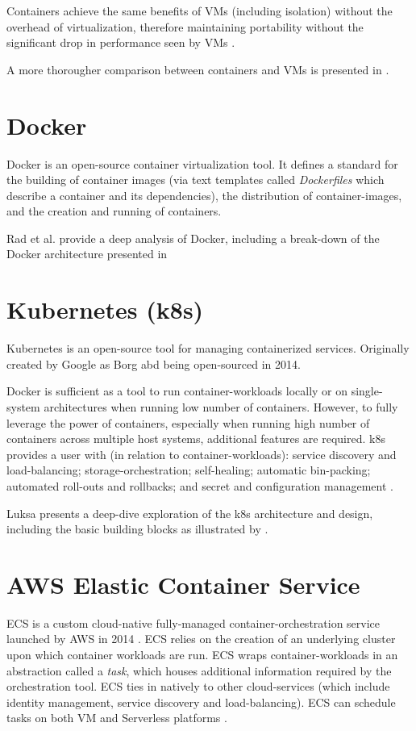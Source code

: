 Containers achieve the same benefits of VMs (including isolation) without the overhead of virtualization, therefore maintaining portability 
without the significant drop in performance seen by VMs \cite{POTDAR20201419}.

A more thorougher comparison between containers and VMs is presented in \cite[Table 1]{6903537}.

\section{Docker}
Docker \cite{docker} is an open-source container virtualization tool. 
It defines a standard for the building of container images (via text templates called \textit{Dockerfiles} which describe a container and its dependencies),
the distribution of container-images, and the creation and running of containers\cite{7093032}.

Rad et al. \cite{rad2017introduction} provide a deep analysis of Docker, including a break-down of the Docker architecture presented in \cite[Fig. 1]{rad2017introduction}

\section{Kubernetes (k8s)}
Kubernetes \cite{kubernetes} is an open-source tool for managing containerized services. 
Originally created by Google as Borg \cite{10.1145/2741948.2741964} abd being open-sourced in 2014\cite{metz_2014}. 

Docker is sufficient as a tool to run container-workloads locally or on single-system architectures when running low number of containers.
However, to fully leverage the power of containers, especially when running high number of containers across multiple host systems, additional features are required.
k8s provides a user with (in relation to container-workloads): service discovery and load-balancing; storage-orchestration; self-healing; automatic bin-packing; automated roll-outs and rollbacks; 
and secret and configuration management \cite{kubernetes_2022}.

Luksa \cite{luksa2017kubernetes} presents a deep-dive exploration of the k8s architecture and design, including the basic building blocks as illustrated by \cite[Figure 1.9]{luksa2017kubernetes}.


\section{AWS Elastic Container Service}
ECS is a custom cloud-native fully-managed container-orchestration service launched by AWS in 2014 \cite{ecs}.
ECS relies on the creation of an underlying cluster upon which container workloads are run.
ECS wraps container-workloads in an abstraction called a \textit{task}, which houses additional information required by the orchestration tool.
ECS ties in natively to other cloud-services (which include identity management, service discovery and load-balancing).
ECS can schedule tasks on both VM and Serverless platforms \cite{ecs_2022}.

